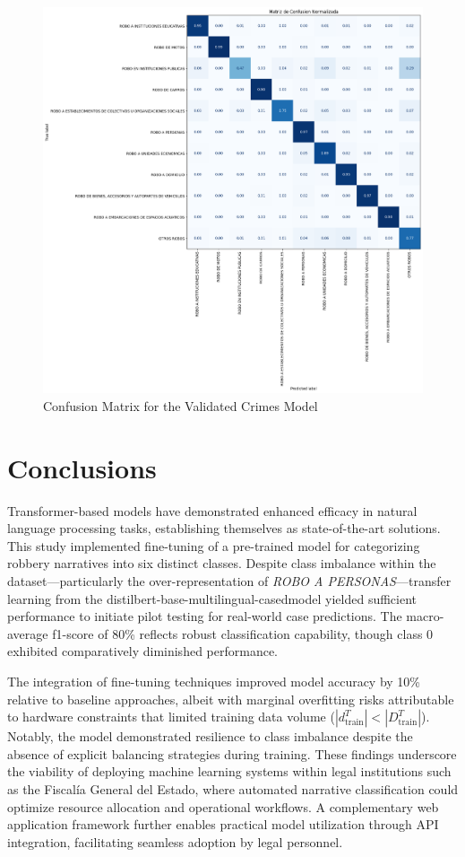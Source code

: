 \documentclass[onecolumn, journal, english, 12pt, a4paper]{IEEEtran} %
\newcommand{\modelohuggingface}{distilbert-base-multilingual-cased}
\theoremstyle{definition}
\begin{document}
\begin{figure}
    \centering
    \includegraphics[width=\textwidth]{imgs/Matriz de Confusion Normalizada DelitosValidados2.png}
    \caption{Confusion Matrix for the Validated Crimes Model}
    \label{fig:matConfDelitosValidados}
\end{figure}

\section{Conclusions}\label{chap:conclusion}
Transformer-based models have demonstrated enhanced efficacy in
natural language processing tasks, establishing themselves as
state-of-the-art solutions. This study implemented fine-tuning of a
pre-trained model for categorizing robbery narratives into six
distinct classes. Despite class imbalance within the
dataset—particularly the over-representation of \emph{ROBO A
  PERSONAS}—transfer learning from the \modelohuggingface model
yielded sufficient performance to initiate pilot testing for
real-world case predictions. The macro-average f1-score of 80\%
reflects robust classification capability, though class 0 exhibited
comparatively diminished performance.

The integration of fine-tuning techniques improved model accuracy by
10\% relative to baseline approaches, albeit with marginal overfitting
risks attributable to hardware constraints that limited training data
volume ($|d_{\text{train}}^T| < |D_{\text{train}}^T|$). Notably, the
model demonstrated resilience to class imbalance despite the absence
of explicit balancing strategies during training. These findings
underscore the viability of deploying machine learning systems within
legal institutions such as the Fiscalía General del Estado, where
automated narrative classification could optimize resource allocation
and operational workflows. A complementary web application framework
further enables practical model utilization through API integration,
facilitating seamless adoption by legal personnel.
\end{document}
